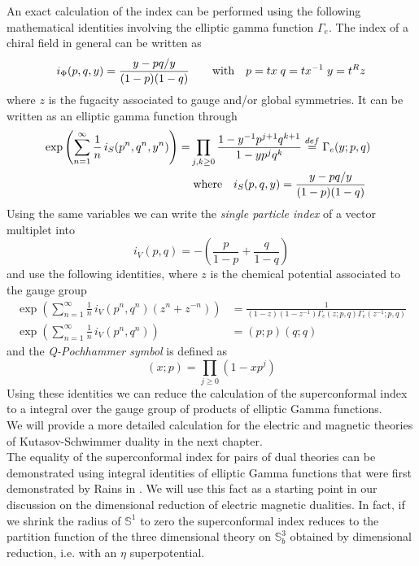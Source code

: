 An exact calculation of the index can be performed using the following mathematical identities involving the elliptic gamma function $\Gamma_e$.
The index of a chiral field in general can be written as
\begin{equation}
i_{\Phi} (p,q,y) = \frac{y - pq/y}{(1-p)(1-q)} \qquad \hbox{with} \quad p=tx \; q=t x^{-1} \; y = t^R z 
\end{equation}
where $z$ is the fugacity associated to gauge and/or global symmetries.
It can be written as an elliptic gamma function through
\begin{align}
 \exp \left(  
\sum_{n=1}^{\infty} \frac{1}{n} \, i_S(p^n,q^n,y^n) \right)=
& \prod_{j,k \geq 0} \frac{1 - y^{-1}p^{j+1}q^{k+1}}{1 - y p^j q^k}
\overset{def}{=} 
\Gamma_e ( y; p, q) 
\\
& \; \hbox{where} \quad i_S(p,q,y) = \frac{y - pq/y}{(1-p)(1-q)} \quad
\end{align}
Using the same variables we can write the \emph{single particle index} of a vector multiplet into
\begin{equation}
i_V(p,q) = - \left( \frac{p}{1-p} + \frac{q}{1-q} \right)
\end{equation}
and use the following identities, where $z$ is the chemical potential associated to the gauge group
\begin{align}
\exp \left(  
\sum_{n=1}^{\infty} \frac{1}{n}\, i_V(p^n,q^n) ( z^n + z^{-n}) \right) & = \frac{1}{(1-z)(1-z^{-1}) \Gamma_e(z;p,q) \Gamma_e(z^{-1};p,q)}
\\
\exp \left(
\sum_{n=1}^{\infty} \frac{1}{n} \, i_V(p^n,q^n) \right) & = (p;p) (q;q)
\end{align}
and the \emph{Q-Pochhammer symbol} is defined as
\begin{equation}
(x;p) = \prod_{j \geq 0} ( 1- x p^j)
\end{equation}
Using these identities we can reduce the calculation of the superconformal index to a integral over the gauge group of products of elliptic Gamma functions.\\
We will provide a more detailed calculation for the electric and magnetic theories of Kutasov-Schwimmer duality in the next chapter.
\\
The equality of the superconformal index for pairs of dual theories can be demonstrated using integral identities of elliptic Gamma functions that were first demonstrated by Rains in \cite{rains309252transformations}.
We will use this fact as a starting point in our discussion on the dimensional reduction of electric magnetic dualities.
In fact, if we shrink the radius of $\mathbb{S}^1 $ to zero the superconformal index reduces to the partition function of the three dimensional theory on $\mathbb{S}_b^3$ obtained by dimensional reduction, i.e. with an $\eta$ superpotential.\\

